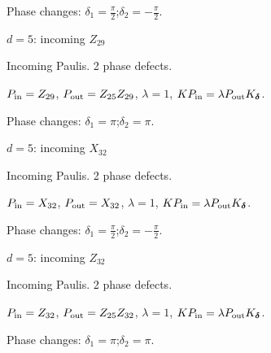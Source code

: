 \par\smallskip\begin{minipage}{.98\linewidth}\small Phase changes: $\delta_{1}=\frac{\pi}{2}$;\quad $\delta_{2}=-\frac{\pi}{2}$.\end{minipage}
\vfill
{\footnotesize\texttt{}}
\newpage
{}
{\Large $d=5$: incoming $Z_{29}$}\par
Incoming Paulis. 2 phase defects.
\begin{center}
\end{center}
\vspace{-1mm}
$P_{\rm in}=Z_{29}$, \quad $P_{\rm out}=Z_{25}Z_{29}$, \quad $\lambda=1$, \qquad $K P_{\rm in}=\lambda P_{\rm out}K_{\boldsymbol\delta}$.
\par\smallskip\begin{minipage}{.98\linewidth}\small Phase changes: $\delta_{1}=\pi$;\quad $\delta_{2}=\pi$.\end{minipage}
\vfill
{\footnotesize\texttt{}}
\newpage
{}
{\Large $d=5$: incoming $X_{32}$}\par
Incoming Paulis. 2 phase defects.
\begin{center}
\end{center}
\vspace{-1mm}
$P_{\rm in}=X_{32}$, \quad $P_{\rm out}=X_{32}$, \quad $\lambda=1$, \qquad $K P_{\rm in}=\lambda P_{\rm out}K_{\boldsymbol\delta}$.
\par\smallskip\begin{minipage}{.98\linewidth}\small Phase changes: $\delta_{1}=\frac{\pi}{2}$;\quad $\delta_{2}=-\frac{\pi}{2}$.\end{minipage}
\vfill
{\footnotesize\texttt{}}
\newpage
{}
{\Large $d=5$: incoming $Z_{32}$}\par
Incoming Paulis. 2 phase defects.
\begin{center}
\end{center}
\vspace{-1mm}
$P_{\rm in}=Z_{32}$, \quad $P_{\rm out}=Z_{25}Z_{32}$, \quad $\lambda=1$, \qquad $K P_{\rm in}=\lambda P_{\rm out}K_{\boldsymbol\delta}$.
\par\smallskip\begin{minipage}{.98\linewidth}\small Phase changes: $\delta_{1}=\pi$;\quad $\delta_{2}=\pi$.\end{minipage}
